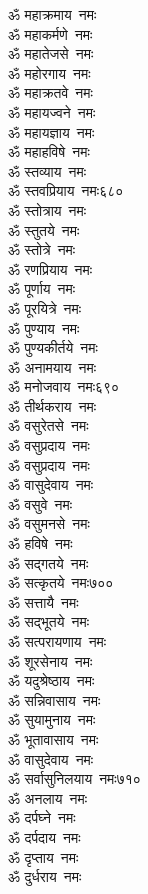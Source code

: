 \begin{multicols}{2}
\begin{flushleft}
ॐ महाक्रमाय~नमः\\
ॐ महाकर्मणे~नमः\\
ॐ महातेजसे~नमः\\
ॐ महोरगाय~नमः\\
ॐ महाक्रतवे~नमः\\
ॐ महायज्वने~नमः\\
ॐ महायज्ञाय~नमः\\
ॐ महाहविषे~नमः\\
ॐ स्तव्याय~नमः\\
ॐ स्तवप्रियाय~नमः\hfill ६८०\\
ॐ स्तोत्राय~नमः\\
ॐ स्तुतये~नमः\\
ॐ स्तोत्रे~नमः\\
ॐ रणप्रियाय~नमः\\
ॐ पूर्णाय~नमः\\
ॐ पूरयित्रे~नमः\\
ॐ पुण्याय~नमः\\
ॐ पुण्यकीर्तये~नमः\\
ॐ अनामयाय~नमः\\
ॐ मनोजवाय~नमः\hfill ६९०\\
ॐ तीर्थकराय~नमः\\
ॐ वसुरेतसे~नमः\\
ॐ वसुप्रदाय~नमः\\
ॐ वसुप्रदाय~नमः\\
ॐ वासुदेवाय~नमः\\
ॐ वसुवे~नमः\\
ॐ वसुमनसे~नमः\\
ॐ हविषे~नमः\\
ॐ सद्गतये~नमः\\
ॐ सत्कृतये~नमः\hfill ७००\\
ॐ सत्तायै~नमः\\
ॐ सद्भूतये~नमः\\
ॐ सत्परायणाय~नमः\\
ॐ शूरसेनाय~नमः\\
ॐ यदुश्रेष्ठाय~नमः\\
ॐ सन्निवासाय~नमः\\
ॐ सुयामुनाय~नमः\\
ॐ भूतावासाय~नमः\\
ॐ वासुदेवाय~नमः\\
ॐ सर्वासुनिलयाय~नमः\hfill ७१०\\
ॐ अनलाय~नमः\\
ॐ दर्पघ्ने~नमः\\
ॐ दर्पदाय~नमः\\
ॐ दृप्ताय~नमः\\
ॐ दुर्धराय~नमः\\

\end{flushleft}
\end{multicols}

